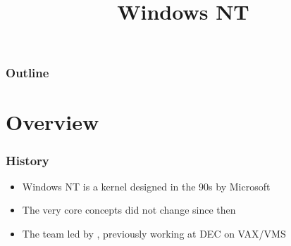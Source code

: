 %
%
%
%
%
%

%
%

%
%

\def\path{../../../..}

%
%



%
%

\title{Windows NT}

%
%



%
%

\begin{frame}
  \titlepage
\end{frame}

%
%

\begin{frame}
  \frametitle{Outline}

  \tableofcontents
\end{frame}

%
%

\section{Overview}


\begin{frame}
  \frametitle{History}

  \begin{itemize}
    \item
      Windows NT is a kernel designed in the 90s by Microsoft
    \item
      The very core concepts did not change since then
    \item
      The team led by , previously working at DEC on VAX/VMS
  \end{itemize}

\end{frame}



